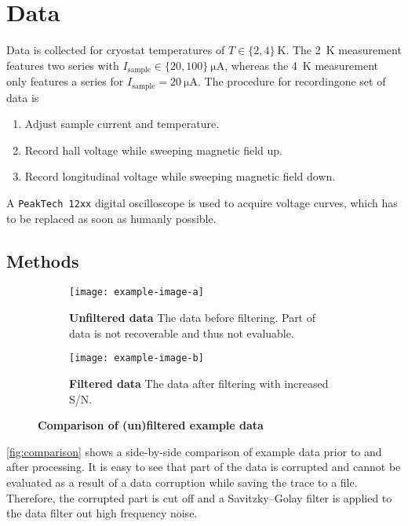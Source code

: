 \chapter{Data}
Data is collected for cryostat temperatures of $T\in\{ 2,4\}\ \si{\kelvin}$.
The \SI{2}{\kelvin} measurement features two series with $I_\text{sample}\in\{ 20,100\}\ \si{\micro\ampere}$, whereas the \SI{4}{\kelvin} measurement only features a series for $I_\text{sample}=\SI{20}{\micro\ampere}$.
The procedure for recordingone set of data is
\begin{enumerate}
	\item Adjust sample current and temperature.
	\item Record hall voltage while sweeping magnetic field up.
	\item Record longitudinal voltage while sweeping magnetic field down.
\end{enumerate}
A \texttt{PeakTech 12xx} digital oscilloscope is used to acquire voltage curves, which has to be replaced as soon as humanly possible.

\section{Methods} %
\begin{figure}
	\centering
	\begin{subfigure}{.48\textwidth}
		\centering
		\texttt{[image: example-image-a]}
		\caption{\textbf{Unfiltered data} The data before filtering. Part of data is not recoverable and thus not evaluable.}
	\end{subfigure}
	\hspace*{\fill}
	\begin{subfigure}{.48\textwidth}
		\centering
		\texttt{[image: example-image-b]}
		\caption{\textbf{Filtered data} The data after filtering with increased S/N.}
	\end{subfigure}
	\caption[Comparison of (un)filtered example data]{\textbf{Comparison of (un)filtered example data}}
	\label{fig:comparison}
\end{figure}
\autoref{fig:comparison} shows a side-by-side comparison of example data prior to and after processing.
It is easy to see that part of the data is corrupted and cannot be evaluated as a result of a data corruption while saving the trace to a file.
Therefore, the corrupted part is cut off and a Savitzky–Golay filter is applied to the data filter out high frequency noise.

